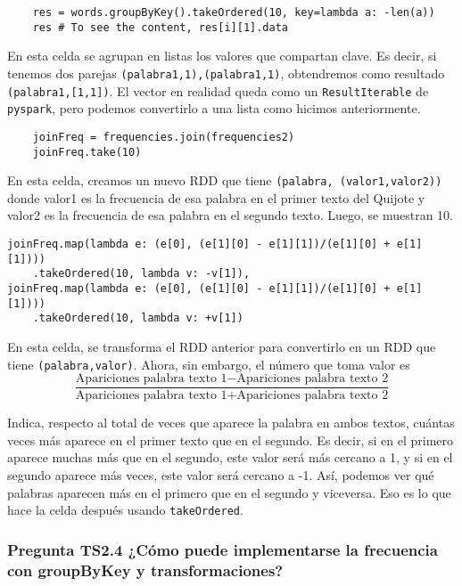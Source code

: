 \documentclass[11pt]{article}
\def\inline{\lstinline[basicstyle=\ttfamily,keywordstyle={}]}
\begin{document}
\begin{verbatim}
    res = words.groupByKey().takeOrdered(10, key=lambda a: -len(a))
    res # To see the content, res[i][1].data
\end{verbatim}

En esta celda se agrupan en listas los valores que compartan clave. Es decir, si tenemos dos parejas \inline{(palabra1,1),(palabra1,1)}, obtendremos como resultado \inline{(palabra1,[1,1])}. El vector en realidad queda como un \inline{ResultIterable} de \inline{pyspark}, pero podemos convertirlo a una lista como hicimos anteriormente.

\begin{verbatim}
	joinFreq = frequencies.join(frequencies2)
	joinFreq.take(10)
\end{verbatim}

En esta celda, creamos un nuevo RDD que tiene \inline{(palabra, (valor1,valor2))} donde valor1 es la frecuencia de esa palabra en el primer texto del Quijote y valor2 es la frecuencia de esa palabra en el segundo texto. Luego, se muestran 10.

\begin{verbatim}
joinFreq.map(lambda e: (e[0], (e[1][0] - e[1][1])/(e[1][0] + e[1][1])))
    .takeOrdered(10, lambda v: -v[1]),
joinFreq.map(lambda e: (e[0], (e[1][0] - e[1][1])/(e[1][0] + e[1][1])))
    .takeOrdered(10, lambda v: +v[1])
\end{verbatim}

En esta celda, se transforma el RDD anterior para convertirlo en un RDD que tiene \inline{(palabra,valor)}. Ahora, sin embargo, el número que toma valor es 
\[
\frac{\text{Apariciones palabra texto 1} - \text{Apariciones palabra texto 2}}{\text{Apariciones palabra texto 1} + \text{Apariciones palabra texto 2}}
\]

Indica, respecto al total de veces que aparece la palabra en ambos textos, cuántas veces más aparece en el primer texto que en el segundo. Es decir, si en el primero aparece muchas más que en el segundo, este valor será más cercano a 1, y si en el segundo aparece más veces, este valor será cercano a -1. Así, podemos ver qué palabras aparecen más en el primero que en el segundo y viceversa. Eso es lo que hace la celda después usando \inline{takeOrdered}.

\subsubsection*{Pregunta TS2.4 ¿Cómo puede implementarse la frecuencia con groupByKey y transformaciones? }
\end{document}
